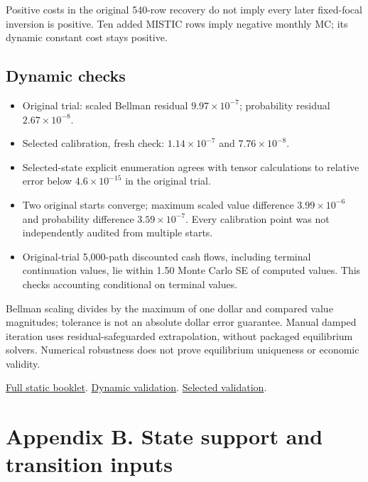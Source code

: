 \documentclass[11pt,]{article}
\providecommand{\tightlist}{%
  \setlength{\itemsep}{0pt}\setlength{\parskip}{0pt}}
\begin{document}
Positive costs in the original 540-row recovery do not imply every later
fixed-focal inversion is positive. Ten added MISTIC rows imply negative
monthly MC; its dynamic constant cost stays positive.

\subsection{Dynamic checks}\label{dynamic-checks}

\begin{itemize}
\tightlist
\item
  Original trial: scaled Bellman residual \(9.97\times10^{-7}\);
  probability residual \(2.67\times10^{-8}\).
\item
  Selected calibration, fresh check: \(1.14\times10^{-7}\) and
  \(7.76\times10^{-8}\).
\item
  Selected-state explicit enumeration agrees with tensor calculations to
  relative error below \(4.6\times10^{-15}\) in the original trial.
\item
  Two original starts converge; maximum scaled value difference
  \(3.99\times10^{-6}\) and probability difference
  \(3.59\times10^{-7}\). Every calibration point was not independently
  audited from multiple starts.
\item
  Original-trial 5,000-path discounted cash flows, including terminal
  continuation values, lie within 1.50 Monte Carlo SE of computed
  values. This checks accounting conditional on terminal values.
\end{itemize}

Bellman scaling divides by the maximum of one dollar and compared value
magnitudes; tolerance is not an absolute dollar error guarantee. Manual
damped iteration uses residual-safeguarded extrapolation, without
packaged equilibrium solvers. Numerical robustness does not prove
equilibrium uniqueness or economic validity.

\href{../../output/static_pricing_subgame/manual_fixed_point_2026-10-28/audit/pricing_audit_plots_with_sequential.pdf}{Full
static booklet}.
\href{../../output/dynamic_entry_exit/manual_dynamic_trial_2026-11-06/dynamic_validation.csv}{Dynamic
validation}.
\href{../../output/dynamic_entry_exit/coordinate_search_2026-11-06/selected_validation.csv}{Selected
validation}.

\clearpage

\section{Appendix B. State support and transition
inputs}\label{appendix-b.-state-support-and-transition-inputs}
\end{document}
